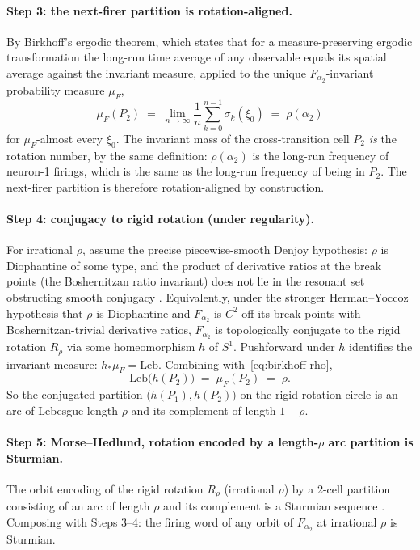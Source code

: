 \documentclass[12pt]{article}
\begin{document}
\paragraph{Step 3: the next-firer partition is rotation-aligned.}
By Birkhoff's ergodic theorem, which states that for a measure-preserving ergodic transformation the long-run time average of any observable equals its spatial average against the invariant measure, applied to the unique $F_{\alpha_2}$-invariant probability measure $\mu_{F}$,
\begin{equation}\label{eq:birkhoff-rho}
    \mu_{F}(P_2) \;=\; \lim_{n\to\infty}\frac{1}{n}\sum_{k=0}^{n-1}\sigma_k(\xi_0) \;=\; \rho(\alpha_2)
\end{equation}
for $\mu_F$-almost every $\xi_0$. The invariant mass of the cross-transition cell $P_2$ \emph{is} the rotation number, by the same definition: $\rho(\alpha_2)$ is the long-run frequency of neuron-1 firings, which is the same as the long-run frequency of being in $P_2$. The next-firer partition is therefore rotation-aligned by construction.

\paragraph{Step 4: conjugacy to rigid rotation (under regularity).}
For irrational $\rho$, assume the precise piecewise-smooth Denjoy hypothesis: $\rho$ is Diophantine of some type, and the product of derivative ratios at the break points (the Boshernitzan ratio invariant) does not lie in the resonant set obstructing smooth conjugacy \citep[as classified by][]{liousse2005nombre,herman1979conjugaison}. Equivalently, under the stronger Herman--Yoccoz hypothesis that $\rho$ is Diophantine and $F_{\alpha_2}$ is $C^2$ off its break points with Boshernitzan-trivial derivative ratios, $F_{\alpha_2}$ is topologically conjugate to the rigid rotation $R_\rho$ via some homeomorphism $h$ of $S^1$. Pushforward under $h$ identifies the invariant measure: $h_*\mu_F=\mathrm{Leb}$. Combining with~\eqref{eq:birkhoff-rho},
\[
    \mathrm{Leb}\bigl(h(P_2)\bigr) \;=\; \mu_F(P_2) \;=\; \rho.
\]
So the conjugated partition $\bigl(h(P_1),h(P_2)\bigr)$ on the rigid-rotation circle is an arc of Lebesgue length $\rho$ and its complement of length $1-\rho$.

\paragraph{Step 5: Morse--Hedlund, rotation encoded by a length-$\rho$ arc partition is Sturmian.}
The orbit encoding of the rigid rotation $R_\rho$ (irrational $\rho$) by a 2-cell partition consisting of an arc of length $\rho$ and its complement is a Sturmian sequence \citep{morse1938symbolic,morse1940symbolic,lothaire2002algebraic}. Composing with Steps 3--4: the firing word of any orbit of $F_{\alpha_2}$ at irrational $\rho$ is Sturmian.
\end{document}
